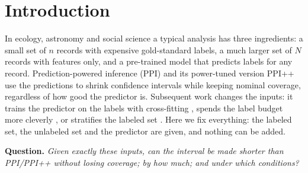 \documentclass{article}
\theoremstyle{remark}\newtheorem{remark}{Remark}
\begin{document}
\section{Introduction}
In ecology, astronomy and social science a typical analysis has three ingredients: a small set of $n$ records with expensive gold-standard labels, a much larger set of $N$ records with features only, and a pre-trained model that predicts labels for any record. Prediction-powered inference (PPI) \citep{angelopoulos2023ppi} and its power-tuned version PPI++ \citep{angelopoulos2023ppipp} use the predictions to shrink confidence intervals while keeping nominal coverage, regardless of how good the predictor is. Subsequent work changes the inputs: it trains the predictor on the labels with cross-fitting \citep{zrnic2023cross}, spends the label budget more cleverly \citep{zrnic2024active}, or stratifies the labeled set \citep{fisch2024stratified}. Here we fix everything: the labeled set, the unlabeled set and the predictor are given, and nothing can be added.

\textbf{Question.} \emph{Given exactly these inputs, can the interval be made shorter than PPI/PPI++ without losing coverage; by how much; and under which conditions?}
\end{document}

